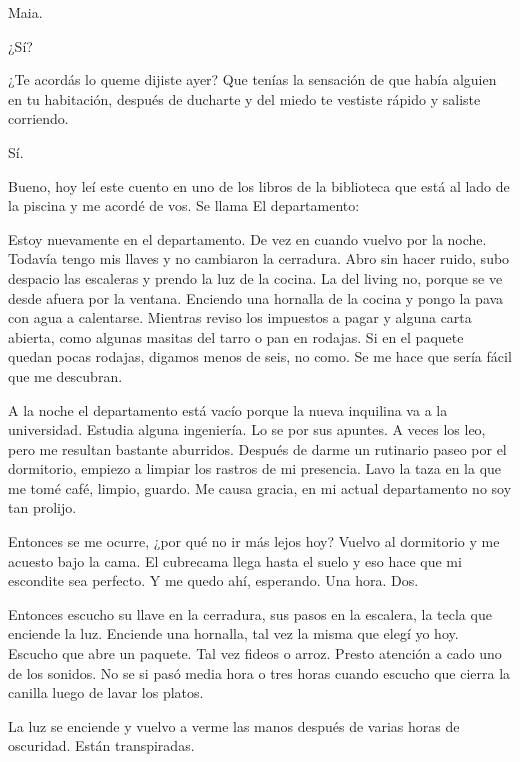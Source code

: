 \documentclass[11pt,twoside,openright,a6paper]{book}
\begin{document}
Maia.

¿Sí?

¿Te acordás lo queme dijiste ayer? Que tenías la sensación de que había
alguien en tu habitación, después de ducharte y del miedo te vestiste
rápido y saliste corriendo.

Sí.

Bueno, hoy leí este cuento en uno de los libros de la biblioteca que está
al lado de la piscina y me acordé de vos. Se llama El departamento:

Estoy nuevamente en el departamento. De vez en cuando vuelvo por la
noche. Todavía tengo mis llaves y no cambiaron la cerradura. Abro sin hacer
ruido, subo despacio las escaleras y prendo la luz de la cocina. La del
living no, porque se ve desde afuera por la ventana. Enciendo una hornalla
de la cocina y pongo la pava con agua a calentarse. Mientras reviso los
impuestos a pagar y alguna carta abierta, como algunas masitas del tarro
o pan en rodajas. Si en el paquete quedan pocas rodajas, digamos menos de
seis, no como. Se me hace que sería fácil que me descubran.

A la noche el departamento está vacío porque la nueva inquilina va a la
universidad. Estudia alguna ingeniería. Lo se por sus apuntes. A veces los
leo, pero me resultan bastante aburridos. Después de darme un rutinario
paseo por el dormitorio, empiezo a limpiar los rastros de mi presencia. Lavo
la taza en la que me tomé café, limpio, guardo. Me causa gracia, en mi
actual departamento no soy tan prolijo.

Entonces se me ocurre, ¿por qué no ir más lejos hoy? Vuelvo al dormitorio
y me acuesto bajo la cama. El cubrecama llega hasta el suelo y eso hace
que mi escondite sea perfecto. Y me quedo ahí, esperando. Una hora. Dos.

Entonces escucho su llave en la cerradura, sus pasos en la escalera, la tecla
que enciende la luz. Enciende una hornalla, tal vez la misma que elegí yo
hoy. Escucho que abre un paquete. Tal vez fideos o arroz. Presto atención
a cado uno de los sonidos. No se si pasó media hora o tres horas cuando
escucho que cierra la canilla luego de lavar los platos.

La luz se enciende y vuelvo a verme las manos después de varias horas de
oscuridad. Están transpiradas.


\vspace{0.5cm}
\hrulefill\hspace{0.2cm} \decofourleft\decofourright \hspace{0.2cm} \hrulefill
\vspace{0.5cm}
\end{document}
